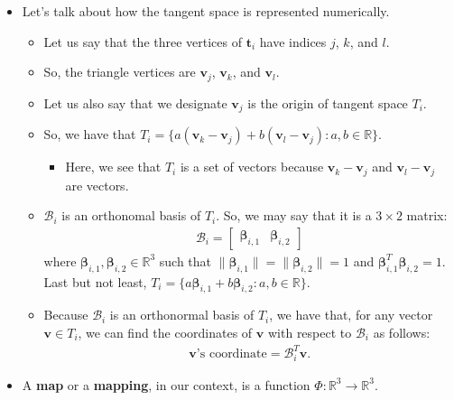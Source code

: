 \documentclass[10pt]{article}
\newcommand{\ve}[1]{\mathbf{#1}}
\newcommand{\ves}[1]{\boldsymbol{#1}}
\newcommand{\ra}{\rightarrow}
\newcommand{\mcal}[1]{\mathcal{#1}}
\newcommand{\Real}{\mathbb{R}}
\begin{document}
\begin{itemize}
    \item Let's talk about how the tangent space is represented numerically.
    \begin{itemize}
        \item Let us say that the three vertices of $\ve{t}_i$ have indices $j$, $k$, and $l$.
        \item So, the triangle vertices are $\ve{v}_j$, $\ve{v}_k$, and $\ve{v}_l$.
        \item Let us also say that we designate $\ve{v}_j$ is the origin of tangent space $T_i$.
        \item So, we have that $T_i = \{ a(\ve{v}_k - \ve{v}_j) + b(\ve{v}_l - \ve{v}_j) : a, b \in \Real \}$.
        \begin{itemize}
            \item Here, we see that $T_i$ is a set of vectors because $\ve{v}_k - \ve{v}_j$ and $\ve{v}_l - \ve{v}_j$ are vectors.            
        \end{itemize}
        \item $\mcal{B}_i$ is an orthonomal basis of $T_i$. So, we may say that it is a $3 \times 2$ matrix:
        \begin{align*}
            \mcal{B}_i = \begin{bmatrix}
                \ves{\beta}_{i,1} & \ves{\beta}_{i,2}
            \end{bmatrix}            
        \end{align*}
        where $\ves{\beta}_{i,1}, \ves{\beta}_{i,2} \in \Real^3$ such that $\| \ves{\beta}_{i,1} \| = \| \ves{\beta}_{i,2} \| = 1$ and $\ves{\beta}_{i,1}^T \ves{\beta}_{i,2} = 1$. Last but not least, $T_i = \{ a \ves{\beta}_{i,1} + b \ves{\beta}_{i,2} : a, b \in \Real \}.$
        \item Because $\mcal{B}_i$ is an orthonormal basis of $T_i$, we have that, for any vector $\ve{v} \in T_i$, we can find the coordinates of $\ve{v}$ with respect to $\mcal{B}_i$ as follows:
        \begin{align*}
            \mbox{$\ve{v}$'s coordinate} = \mcal{B}_i^T \ve{v}.
        \end{align*}
    \end{itemize}
    
    \item A {\bf map} or a {\bf mapping}, in our context, is a function $\Phi: \Real^3 \ra \Real^3$.
    

\end{itemize}
\end{document}
